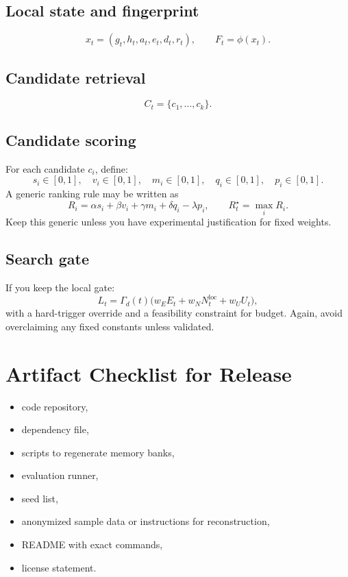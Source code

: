 \documentclass{article}
\begin{document}
\subsection{Local state and fingerprint}
\[
x_t = (g_t, h_t, a_t, e_t, d_t, r_t), \qquad F_t = \phi(x_t).
\]

\subsection{Candidate retrieval}
\[
C_t = \{c_1,\ldots,c_k\}.
\]

\subsection{Candidate scoring}
For each candidate $c_i$, define:
\[
s_i \in [0,1],\quad
v_i \in [0,1],\quad
m_i \in [0,1],\quad
q_i \in [0,1],\quad
p_i \in [0,1].
\]
A generic ranking rule may be written as
\[
R_i = \alpha s_i + \beta v_i + \gamma m_i + \delta q_i - \lambda p_i,
\qquad
R_t^\star = \max_i R_i.
\]
Keep this generic unless you have experimental justification for fixed weights.

\subsection{Search gate}
If you keep the local gate:
\[
L_t = \Gamma_d(t)\bigl(w_E E_t + w_N N_t^{\text{loc}} + w_U U_t\bigr),
\]
with a hard-trigger override and a feasibility constraint for budget.
Again, avoid overclaiming any fixed constants unless validated.

\section{Artifact Checklist for Release}
\begin{itemize}[leftmargin=*,itemsep=2pt,topsep=2pt]
    \item code repository,
    \item dependency file,
    \item scripts to regenerate memory banks,
    \item evaluation runner,
    \item seed list,
    \item anonymized sample data or instructions for reconstruction,
    \item README with exact commands,
    \item license statement.
\end{itemize}

\end{document}
